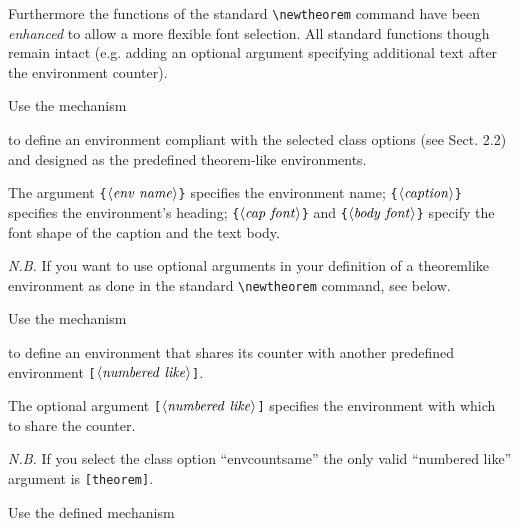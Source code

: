 \documentclass[graybox,square]{svmono}
\begin{document}
\begin{sloppy}
Furthermore the functions of the standard \verb|\newtheorem| command have been {\it enhanced} to allow a more flexible font selection. All standard functions though remain intact (e.g. adding an optional argument specifying additional text after the environment counter).

Use the mechanism

\cprotect{}

to define an environment compliant with the selected class options (see Sect. 2.2) and designed as the predefined theorem-like environments.

The argument \verb|{|$\langle {\it env~name}\rangle$\verb|}| specifies the environment name; \verb|{|$\langle {\it caption}\rangle$\verb|}| specifies the environment's heading; \verb|{|$\langle {\it cap~font}\rangle$\verb|}| and \verb|{|$\langle {\it body~font}\rangle$\verb|}| specify the font shape of the caption and the text body.

{\it N.B.} If you want to use optional arguments in your definition of a theoremlike environment as done in the standard \verb|\newtheorem| command, see below.

Use the mechanism
\cprotect{}

to define an environment that shares its counter with another predefined environment \verb|[|$\langle {\it numbered~like}\rangle$\verb|]|.

The optional argument \verb|[|$\langle {\it numbered~like}\rangle$\verb|]| specifies the environment with which to share the counter.


{\it N.B.} If you select the class option ``envcountsame'' the only valid ``numbered like'' argument is \verb|[theorem]|.



Use the defined mechanism

\cprotect{}


\end{sloppy}
\end{document}
